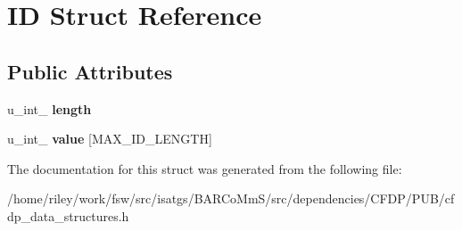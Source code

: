 \hypertarget{struct_i_d}{}\section{ID Struct Reference}
\label{struct_i_d}
\subsection*{Public Attributes}
\begin{DoxyCompactItemize}
\item 
u\+\_\+int\+\_ {\bfseries length}\hypertarget{struct_i_d_a7610d6b1fe7ba0b4c75614a0b0459cdc}{}\label{struct_i_d_a7610d6b1fe7ba0b4c75614a0b0459cdc}

\item 
u\+\_\+int\+\_ {\bfseries value} \mbox{[}M\+A\+X\+\_\+\+I\+D\+\_\+\+L\+E\+N\+G\+TH\mbox{]}\hypertarget{struct_i_d_a0b4e0b8aeb9e93177c6ba5dfe8d0ef43}{}\label{struct_i_d_a0b4e0b8aeb9e93177c6ba5dfe8d0ef43}

\end{DoxyCompactItemize}


The documentation for this struct was generated from the following file\+:\begin{DoxyCompactItemize}
\item 
/home/riley/work/fsw/src/isatgs/\+B\+A\+R\+Co\+Mm\+S/src/dependencies/\+C\+F\+D\+P/\+P\+U\+B/cfdp\+\_\+data\+\_\+structures.\+h\end{DoxyCompactItemize}
